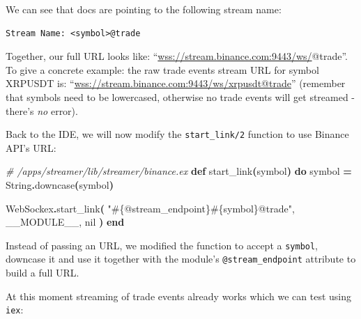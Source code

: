 \documentclass[
  oneside]{book}
\newenvironment{Shaded}{\begin{snugshade}}{\end{snugshade}}
\newcommand{\CommentTok}[1]{\textcolor[rgb]{0.56,0.35,0.01}{\textit{#1}}}
\newcommand{\ConstantTok}[1]{\textcolor[rgb]{0.56,0.35,0.01}{#1}}
\newcommand{\FunctionTok}[1]{\textcolor[rgb]{0.13,0.29,0.53}{\textbf{#1}}}
\newcommand{\KeywordTok}[1]{\textcolor[rgb]{0.13,0.29,0.53}{\textbf{#1}}}
\newcommand{\NormalTok}[1]{#1}
\newcommand{\OperatorTok}[1]{\textcolor[rgb]{0.81,0.36,0.00}{\textbf{#1}}}
\newcommand{\OtherTok}[1]{\textcolor[rgb]{0.56,0.35,0.01}{#1}}
\newcommand{\StringTok}[1]{\textcolor[rgb]{0.31,0.60,0.02}{#1}}
\begin{document}
We can see that docs are pointing to the following stream name:

\begin{verbatim}
Stream Name: <symbol>@trade
\end{verbatim}

Together, our full URL looks like: ``\url{wss://stream.binance.com:9443/ws/}@trade''.
To give a concrete example: the raw trade events stream URL for symbol XRPUSDT is:
``\url{wss://stream.binance.com:9443/ws/xrpusdt@trade}'' (remember that symbols need to be lowercased, otherwise no trade events will get streamed - there's \emph{no} error).

\newpage

Back to the IDE, we will now modify the \texttt{start\_link/2} function to use Binance API's URL:

\begin{Shaded}
\begin{Highlighting}[]
  \CommentTok{\# /apps/streamer/lib/streamer/binance.ex}
  \KeywordTok{def}\NormalTok{ start\_link}\FunctionTok{(}\NormalTok{symbol}\FunctionTok{)} \KeywordTok{do}
\NormalTok{    symbol }\OperatorTok{=} \ConstantTok{String}\OperatorTok{.}\NormalTok{downcase}\FunctionTok{(}\NormalTok{symbol}\FunctionTok{)}

    \ConstantTok{WebSockex}\OperatorTok{.}\NormalTok{start\_link}\FunctionTok{(}
      \StringTok{"}\OtherTok{\#\{@stream\_endpoint\}\#\{}\NormalTok{symbol}\OtherTok{\}}\StringTok{@trade"}\NormalTok{,}
      \ConstantTok{\_\_MODULE\_\_}\NormalTok{,}
      \ConstantTok{nil}
    \FunctionTok{)}
  \KeywordTok{end}
\end{Highlighting}
\end{Shaded}

Instead of passing an URL, we modified the function to accept a \texttt{symbol}, downcase it and use it together with the module's \texttt{@stream\_endpoint} attribute to build a full URL.

At this moment streaming of trade events already works which we can test using \texttt{iex}:
\end{document}
